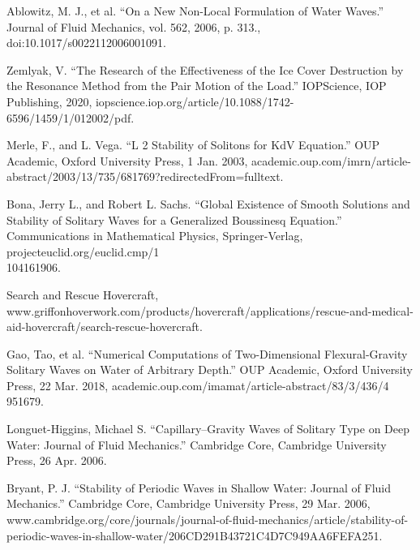 \documentclass{article}
\begin{document}
\begin{enumerate}
{\item{Ablowitz, M. J., et al. “On a New Non-Local Formulation of Water Waves.” Journal of Fluid Mechanics, vol. 562, 2006, p. 313., doi:10.1017/s0022112006001091.} \label{AFM} \\

\item{Zemlyak, V. “The Research of the Effectiveness of the Ice Cover Destruction by the Resonance Method from the Pair Motion of the Load.” IOPScience, IOP Publishing, 2020, iopscience.iop.org/article/10.1088/1742-6596/1459/1/012002/pdf.}  \label{resonancemethod} \\

\item{Merle, F., and L. Vega. “L 2 Stability of Solitons for KdV Equation.” OUP Academic, Oxford University Press, 1 Jan. 2003, academic.oup.com/imrn/article-abstract/2003/13/735/681769?redirectedFrom=fulltext.} \label{kdv} \\

\item{Bona, Jerry L., and Robert L. Sachs. “Global Existence of Smooth Solutions and Stability of Solitary Waves for a Generalized Boussinesq Equation.” Communications in Mathematical Physics, Springer-Verlag, projecteuclid.org/euclid.cmp/1\\104161906.} \label{bouss} \\


\item{Search and Rescue Hovercraft, www.griffonhoverwork.com/products/hovercraft/applications/rescue-and-medical-aid-hovercraft/search-rescue-hovercraft.} \label{hovercraft} \\

\item{Gao, Tao, et al. “Numerical Computations of Two-Dimensional Flexural-Gravity Solitary Waves on Water of Arbitrary Depth.” OUP Academic, Oxford University Press, 22 Mar. 2018, academic.oup.com/imamat/article-abstract/83/3/436/4\\951679.} \label{gao} \\

\item{Longuet-Higgins, Michael S. “Capillary–Gravity Waves of Solitary Type on Deep Water: Journal of Fluid Mechanics.” Cambridge Core, Cambridge University Press, 26 Apr. 2006.} \label{cap2} \\

\item{Bryant, P. J. “Stability of Periodic Waves in Shallow Water: Journal of Fluid Mechanics.” Cambridge Core, Cambridge University Press, 29 Mar. 2006, www.cambridge.org/core/journals/journal-of-fluid-mechanics/article/stability-of-periodic-waves-in-shallow-water/206CD291B43721C4D7C949AA6FEFA251.} \label{bryant} \\


}
\end{enumerate}
\end{document}
